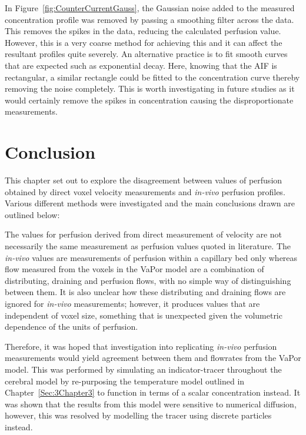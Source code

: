 \documentclass[11pt,english,a4paper,twoside,openright]{report}
\begin{document}
{{{{{{{In Figure~\ref{fig:CounterCurrentGauss}, the Gaussian noise added to the measured concentration profile was removed by passing a smoothing filter across the data. This removes the spikes in the data, reducing the calculated perfusion value. However, this is a very coarse method for achieving this and it can affect the resultant profiles quite severely. An alternative practice is to fit smooth curves that are expected such as exponential decay. Here, knowing that the AIF is rectangular, a similar rectangle could be fitted to the concentration curve thereby removing the noise completely. This is worth investigating in future studies as it would certainly remove the spikes in concentration causing the disproportionate measurements.

\section[Conclusion]{{\Large C}onclusion}

This chapter set out to explore the disagreement between values of perfusion obtained by direct voxel velocity measurements and \textit{in-vivo} perfusion profiles. Various different methods were investigated and the main conclusions drawn are outlined below:

The values for perfusion derived from direct measurement of velocity are not necessarily the same measurement as perfusion values quoted in literature. The \textit{in-vivo} values are measurements of perfusion within a capillary bed only whereas flow measured from the voxels in the VaPor model are a combination of distributing, draining and perfusion flows, with no simple way of distinguishing between them. It is also unclear how these distributing and draining flows are ignored for \textit{in-vivo} measurements; however, it produces values that are independent of voxel size, something that is unexpected given the volumetric dependence of the units of perfusion. 

Therefore, it was hoped that investigation into replicating \textit{in-vivo} perfusion measurements would yield agreement between them and flowrates from the VaPor model. This was performed by simulating an indicator-tracer throughout the cerebral model by re-purposing the temperature model outlined in Chapter~\ref{Sec:3Chapter3} to function in terms of a scalar concentration instead.  It was shown that the results from this model were sensitive to numerical diffusion, however, this was resolved by modelling the tracer using discrete particles instead.

}}}}}}}
\end{document}

